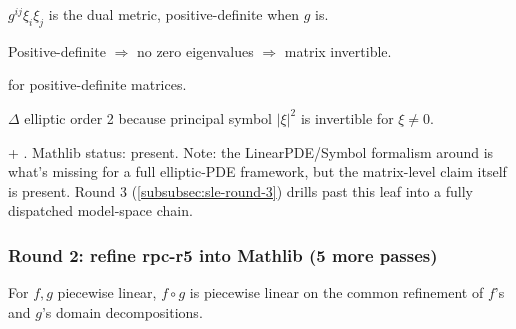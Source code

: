 \begin{lemma}
\label{lem:sle-r6}
$g^{ij}\xi_{i}\xi_{j}$ is the dual metric, positive-definite when $g$ is.
\leanok
\end{lemma}

\begin{lemma}
\label{lem:sle-r7}
Positive-definite $\Rightarrow$ no zero eigenvalues $\Rightarrow$ matrix invertible.
\leanok
\end{lemma}

\begin{lemma}
\label{lem:sle-r8}
 for positive-definite matrices.
\leanok\mathlibok
\end{lemma}

\begin{lemma}
\label{lem:sle-r9}
$\Delta$ elliptic order 2 because principal symbol $|\xi|^{2}$ is invertible for $\xi \neq 0$.
\leanok
\end{lemma}

\begin{lemma}
\label{lem:sle-r10}
 + .  Mathlib status: present.  Note: the LinearPDE/Symbol formalism around  is what's missing for a full elliptic-PDE framework, but the matrix-level claim itself is present.  Round 3 (\ref{subsubsec:sle-round-3}) drills past this leaf into a fully dispatched model-space chain.
\leanok\mathlibok
\end{lemma}

\subsubsection*{Round 2: refine rpc-r5 into Mathlib (5 more passes)}

\begin{lemma}
\label{lem:rpc-r6}
For $f, g$ piecewise linear, $f\circ g$ is piecewise linear on the common refinement of $f$'s and $g$'s domain decompositions.
\leanok
\end{lemma}

